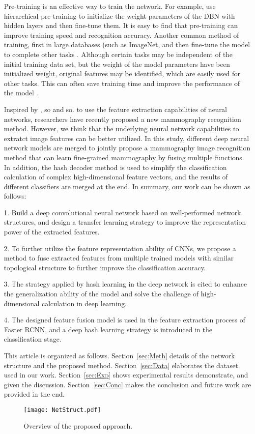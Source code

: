 Pre-training is an effective way to train the 
network.
For example, use hierarchical pre-training to 
initialize the weight parameters of the DBN 
with hidden layers and then fine-tune them.
It is easy to find that pre-training can improve 
training speed and recognition accuracy. 
Another common method of training, first in 
large databases (such as ImageNet, and then 
fine-tune the model to complete other tasks
\cite{Russakovsky2015,9112355}.
Although certain tasks may be independent of 
the initial training data set, but the weight 
of the model parameters have been initialized 
weight, original features may be identified, 
which are easily used for other tasks.
This can often save training time and improve 
the performance of the model
\cite{He2016,Moreira2018}.


Inspired by \cite{Lin2020}, so and so.
to use the feature extraction capabilities 
of neural networks, researchers have recently 
proposed a new mammography recognition method.
However, we think that the underlying neural 
network capabilities to extratct image features 
can be better utilized.
In this study, different deep neural network 
models are merged to jointly propose a 
mammography image recognition method that can 
learn fine-grained mammography by fusing 
multiple functions.
In addition, the hash decoder method is used 
to simplify the classification calculation of 
complex high-dimensional feature vectors, 
and the results of different classifiers are 
merged at the end.
In summary, our work can be shown as follows:

1. Build a deep convolutional neural network based 
on well-performed network structures, and design a 
transfer learning strategy to improve the 
representation power of the extracted features.

2. To further utilize the feature representation 
ability of CNNs, we propose a method to fuse 
extracted features from multiple trained models 
with similar topological structure to
further improve the classification accuracy.

3. The strategy applied by hash learning in the 
deep network is cited to enhance the 
generalization ability of the model and solve the 
challenge of high-dimensional calculation 
in deep learning.

4. The designed feature fusion model is used in 
the feature extraction process of Faster RCNN, 
and a deep hash learning strategy is introduced 
in the classification stage.

This article is organized as follows. 
Section~\ref{sec:Meth} 
details of the network structure and the proposed 
method. 
Section~\ref{sec:Data} 
elaborates the dataset used in our work.
Section~\ref{sec:Exp} 
shows experimental results demonstrate, and 
given the discussion.
Section~\ref{sec:Conc} 
makes the conclusion and future work are provided 
in the end.

\begin{figure*}[!ht]
    \centering
    \texttt{[image: NetStruct.pdf]}
    \caption{Overview of the proposed approach.}
    \label{fig:netStruct}
\end{figure*}
